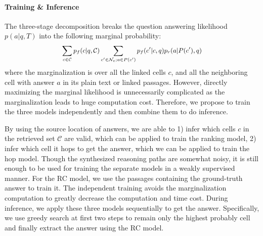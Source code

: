 \documentclass[11pt,a4paper]{article}
\begin{document}
\paragraph{Training \& Inference}
The three-stage decomposition breaks the question answering likelihood $p(a|q, T)$ into the following marginal probability: 
\begin{align*}
\small
\begin{split}
    \sum_{c \in \mathcal{C}}p_f(c|q, \mathcal{C}) \sum_{c' \in \mathcal{N}_c; a \in P(c')} p_f(c'|c, q) p_r(a|P(c'), q)
\end{split}
\end{align*}
where the marginalization is over all the linked cells $c$, and all the neighboring cell with answer $a$ in its plain text or linked passages. However, directly maximizing the marginal likelihood is unnecessarily complicated as the marginalization leads to huge computation cost. Therefore, we propose to train the three models independently and then combine them to do inference.

By using the source location of answers, we are able to 1) infer which cells $c$ in the retrieved set $\mathcal{C}$ are valid, which can be applied to train the ranking model, 2) infer which cell it hops to get the answer, which we can be applied to train the hop model. Though the synthesized reasoning paths are somewhat noisy, it is still enough to be used for training the separate models in a weakly supervised manner. For the RC model, we use the passages containing the ground-truth answer to train it. The independent training avoids the marginalization computation to greatly decrease the computation and time cost. During inference, we apply these three models sequentially to get the answer. Specifically, we use greedy search at first two steps to remain only the highest probably cell and finally extract the answer using the RC model. 
\end{document}
